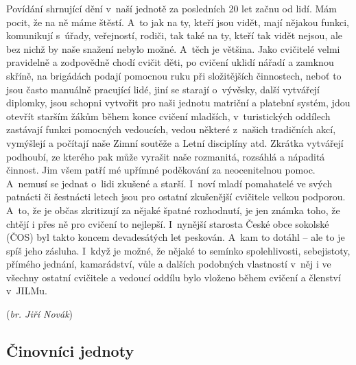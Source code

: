\documentclass[a5paper, 11pt, twoside]{article}
\begin{document}
Povídání shrnující dění v~naší jednotě za posledních 20 let začnu od
lidí. Mám pocit, že na ně máme štěstí. A~to jak na ty, kteří jsou vidět,
mají nějakou funkci, komunikují s~úřady, veřejností, rodiči, tak také na
ty, kteří tak vidět nejsou, ale bez nichž by naše snažení nebylo možné.
A~těch je většina. Jako cvičitelé velmi pravidelně a zodpovědně chodí
cvičit děti, po cvičení uklidí nářadí a zamknou skříně, na brigádách
podají pomocnou ruku při složitějších činnostech, neboť to jsou často
manuálně pracující lidé, jiní se starají o~vývěsky, další vytvářejí
diplomky, jsou schopni vytvořit pro naši jednotu matriční a platební
systém, jdou otevřít starším žákům během konce cvičení mladších,
v~turistických oddílech zastávají funkci pomocných vedoucích, vedou
některé z~našich tradičních akcí, vymýšlejí a počítají naše Zimní
soutěže a Letní disciplíny atd. Zkrátka vytvářejí podhoubí, ze kterého
pak může vyrašit naše rozmanitá, rozsáhlá a nápaditá činnost. Jim všem
patří mé upřímné poděkování za neocenitelnou pomoc. A~nemusí se jednat
o~lidi zkušené a starší. I~noví mladí pomahatelé ve svých patnácti či
šestnácti letech jsou pro ostatní zkušenější cvičitele velkou podporou.
A~to, že je občas zkritizují za nějaké špatné rozhodnutí, je jen známka
toho, že chtějí i přes ně pro cvičení to nejlepší. I~nynější starosta
České obce sokolské (ČOS) byl takto koncem devadesátých let peskován.
A~kam to dotáhl -- ale to je spíš jeho zásluha. I~když je možné, že nějaké
to semínko spolehlivosti, sebejistoty, přímého jednání, kamarádství,
vůle a dalších podobných vlastností v~něj i ve všechny ostatní cvičitele
a vedoucí oddílu bylo vloženo během cvičení a členství v~JILMu.

\hfill(\textit{br. Jiří Novák})


\subsection{Činovníci jednoty}
\end{document}
